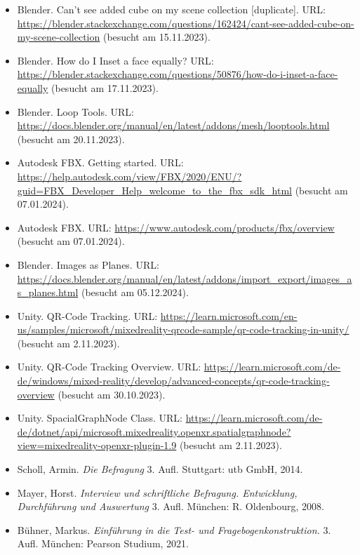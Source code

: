 \begin{itemize}
    \item Blender. Can't see added cube on my scene collection [duplicate]. URL: \url{https://blender.stackexchange.com/questions/162424/cant-see-added-cube-on-my-scene-collection} (besucht am 15.11.2023).
    \item Blender. How do I Inset a face equally? URL: \url{https://blender.stackexchange.com/questions/50876/how-do-i-inset-a-face-equally} (besucht am 17.11.2023).
    \item Blender. Loop Tools. URL: \url{https://docs.blender.org/manual/en/latest/addons/mesh/looptools.html} (besucht am 20.11.2023).
    \item Autodesk FBX. Getting started. URL: \url{https://help.autodesk.com/view/FBX/2020/ENU/?guid=FBX_Developer_Help_welcome_to_the_fbx_sdk_html} (besucht am 07.01.2024).
    \item Autodesk FBX. URL: \url{https://www.autodesk.com/products/fbx/overview} (besucht am 07.01.2024).
    \item Blender. Images as Planes. URL: \url{https://docs.blender.org/manual/en/latest/addons/import_export/images_as_planes.html} (besucht am 05.12.2024).
    \item Unity. QR-Code Tracking. URL: \url{https://learn.microsoft.com/en-us/samples/microsoft/mixedreality-qrcode-sample/qr-code-tracking-in-unity/} (besucht am 2.11.2023).
    \item Unity. QR-Code Tracking Overview. URL: \url{https://learn.microsoft.com/de-de/windows/mixed-reality/develop/advanced-concepts/qr-code-tracking-overview} (besucht am 30.10.2023).
    \item Unity. SpacialGraphNode Class. URL: \url{https://learn.microsoft.com/de-de/dotnet/api/microsoft.mixedreality.openxr.spatialgraphnode?view=mixedreality-openxr-plugin-1.9} (besucht am 2.11.2023).
    \item Scholl, Armin. \textit{Die Befragung} 3. Aufl. Stuttgart: utb GmbH, 2014.
    \item Mayer, Horst. \textit{Interview und schriftliche Befragung. Entwicklung, Durchführung und Auswertung} 3. Aufl. München: R. Oldenbourg, 2008.
    \item Bühner, Markus. \textit{Einführung in die Test- und Fragebogenkonstruktion.} 3. Aufl. München: Pearson Studium, 2021.
\end{itemize}


